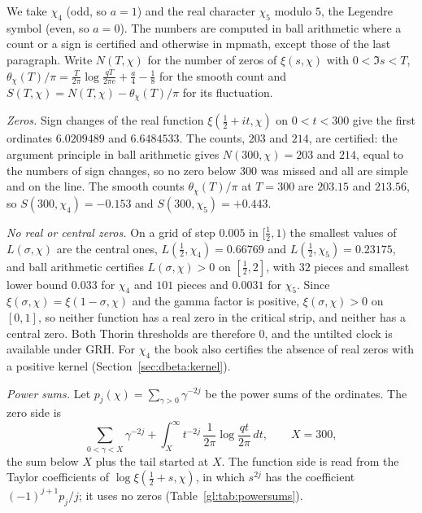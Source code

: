 We take $\chi_4$ (odd, so $a=1$) and the real character $\chi_5$ modulo $5$, the Legendre symbol (even, so $a=0$). The numbers are computed in ball arithmetic where a count or a sign is certified and otherwise in mpmath, except those of the last paragraph. Write $N(T,\chi)$ for the number of zeros of $\xi(s,\chi)$ with $0<\Im s<T$, $\theta_\chi(T)/\pi=\tfrac{T}{2\pi}\log\tfrac{qT}{2\pi e}+\tfrac a4-\tfrac18$ for the smooth count and $S(T,\chi)=N(T,\chi)-\theta_\chi(T)/\pi$ for its fluctuation.

\emph{Zeros.} Sign changes of the real function $\xi(\tfrac12+it,\chi)$ on $0<t<300$ give the first ordinates $6.0209489$ and $6.6484533$. The counts, $203$ and $214$, are certified: the argument principle in ball arithmetic gives $N(300,\chi)=203$ and $214$, equal to the numbers of sign changes, so no zero below $300$ was missed and all are simple and on the line. The smooth counts $\theta_\chi(T)/\pi$ at $T=300$ are $203.15$ and $213.56$, so $S(300,\chi_4)=-0.153$ and $S(300,\chi_5)=+0.443$.

\emph{No real or central zeros.} On a grid of step $0.005$ in $[\tfrac12,1)$ the smallest values of $L(\sigma,\chi)$ are the central ones, $L(\tfrac12,\chi_4)=0.66769$ and $L(\tfrac12,\chi_5)=0.23175$, and ball arithmetic certifies $L(\sigma,\chi)>0$ on $[\tfrac12,2]$, with $32$ pieces and smallest lower bound $0.033$ for $\chi_4$ and $101$ pieces and $0.0031$ for $\chi_5$. Since $\xi(\sigma,\chi)=\xi(1-\sigma,\chi)$ and the gamma factor is positive, $\xi(\sigma,\chi)>0$ on $[0,1]$, so neither function has a real zero in the critical strip, and neither has a central zero. Both Thorin thresholds are therefore $0$, and the untilted clock is available under GRH. For $\chi_4$ the book also certifies the absence of real zeros with a positive kernel (Section~\ref{sec:dbeta:kernel}).

\emph{Power sums.} Let $p_j(\chi)=\sum_{\gamma>0}\gamma^{-2j}$ be the power sums of the ordinates. The zero side is
\[
\sum_{0<\gamma<X}\gamma^{-2j}+\int_X^\infty t^{-2j}\,\frac1{2\pi}\log\frac{qt}{2\pi}\,dt,\qquad X=300,
\]
the sum below $X$ plus the tail started at $X$. The function side is read from the Taylor coefficients of $\log\xi(\tfrac12+s,\chi)$, in which $s^{2j}$ has the coefficient $(-1)^{j+1}p_j/j$; it uses no zeros (Table~\ref{gl:tab:powersums}).

